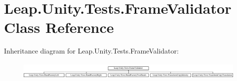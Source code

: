 \hypertarget{class_leap_1_1_unity_1_1_tests_1_1_frame_validator}{}\section{Leap.\+Unity.\+Tests.\+Frame\+Validator Class Reference}
\label{class_leap_1_1_unity_1_1_tests_1_1_frame_validator}
Inheritance diagram for Leap.\+Unity.\+Tests.\+Frame\+Validator\+:\begin{figure}[H]
\begin{center}
\leavevmode
\includegraphics[height=0.842105cm]{class_leap_1_1_unity_1_1_tests_1_1_frame_validator}
\end{center}
\end{figure}
